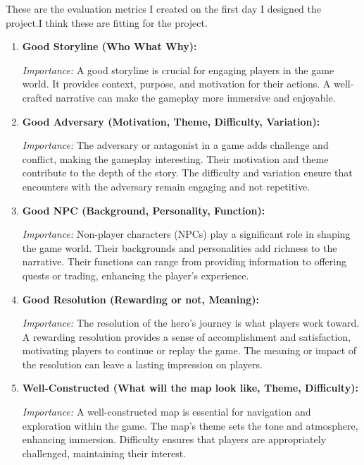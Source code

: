 \documentclass[10pt,twocolumn]{article}
\begin{document}
These are the evaluation metrics I created on the first day I designed the project.I think these are fitting for the project.

\begin{enumerate}
    \item \textbf{Good Storyline (Who What Why):}
    
    \textit{Importance:} A good storyline is crucial for engaging players in the game world. It provides context, purpose, and motivation for their actions. A well-crafted narrative can make the gameplay more immersive and enjoyable.\cite{reddit_dnd_campaign_fun}
    
    \item \textbf{Good Adversary (Motivation, Theme, Difficulty, Variation):}
    
    \textit{Importance:} The adversary or antagonist in a game adds challenge and conflict, making the gameplay interesting. Their motivation and theme contribute to the depth of the story. The difficulty and variation ensure that encounters with the adversary remain engaging and not repetitive.\cite{reddit_dnd_campaign_fun}
    
    \item \textbf{Good NPC (Background, Personality, Function):}
    
    \textit{Importance:} Non-player characters (NPCs) play a significant role in shaping the game world. Their backgrounds and personalities add richness to the narrative. Their functions can range from providing information to offering quests or trading, enhancing the player's experience.\cite{reddit_dnd_campaign_fun}
    
    \item \textbf{Good Resolution (Rewarding or not, Meaning):}
    
    \textit{Importance:} The resolution of the hero's journey is what players work toward. A rewarding resolution provides a sense of accomplishment and satisfaction, motivating players to continue or replay the game. The meaning or impact of the resolution can leave a lasting impression on players.\cite{reddit_dmacademy_oneshot}
    
    \item \textbf{Well-Constructed (What will the map look like, Theme, Difficulty):}
    
    \textit{Importance:} A well-constructed map is essential for navigation and exploration within the game. The map's theme sets the tone and atmosphere, enhancing immersion. Difficulty ensures that players are appropriately challenged, maintaining their interest.\cite{reddit_dmacademy_oneshot}
\end{enumerate}
\end{document}
